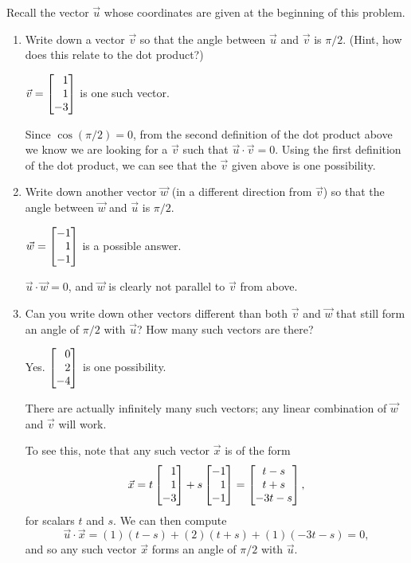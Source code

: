\begin{parts}
		\item Recall the vector $\vec u$ whose coordinates are given at the beginning of this problem.
		\begin{enumerate}
			\item Write down a vector $\vec v$ so that the angle between $\vec u$
				and $\vec v$ is $\pi/2$. (Hint, how does this relate to the dot
				product?)
				\begin{solution}
					$\vec v = \mat{1\\1\\-3}$ is one such vector.

					Since $\cos(\pi/2) = 0$, from the second definition of the dot
					product above we know we are looking for a $\vec v$ such that
					$\vec u \cdot \vec v = 0$. Using the first definition of the
					dot product, we can see that the $\vec v$ given above is one
					possibility.
				\end{solution}
			\item Write down another vector $\vec w$ (in a different direction from
				$\vec v$) so that the angle between $\vec w$ and $\vec u$ is $\pi/2$.
				\begin{solution}
					$\vec w = \mat{-1\\1\\-1}$ is a possible answer.

					$\vec u \cdot \vec w = 0$, and $\vec w$ is clearly not parallel
					to $\vec v$ from above.
				\end{solution}
			\item Can you write down other vectors different than both $\vec v$
				and $\vec w$ that still	form an angle of $\pi/2$ with $\vec u$?
				How many such vectors are there?
				\begin{solution}
					Yes. $\mat{0\\2\\-4}$ is one possibility.

					There are actually infinitely many such vectors; any linear
					combination of $\vec w$ and $\vec v$ will work.

					To see this, note that any such vector $\vec x$ is of the form
					\[
						\vec x = t \mat{1\\1\\-3} + s \mat{-1\\1\\-1}
						= \matc{t-s\\t+s\\-3t-s},
					\]
					for scalars $t$ and $s$. We can then compute
					\[
						\vec u \cdot \vec x = (1)(t-s) + (2)(t+s) + (1)(-3t-s) = 0,
					\]
					and so any such vector $\vec x$ forms an angle of $\pi/2$
					with $\vec u$.
				\end{solution}
		\end{enumerate}
	\end{parts}



